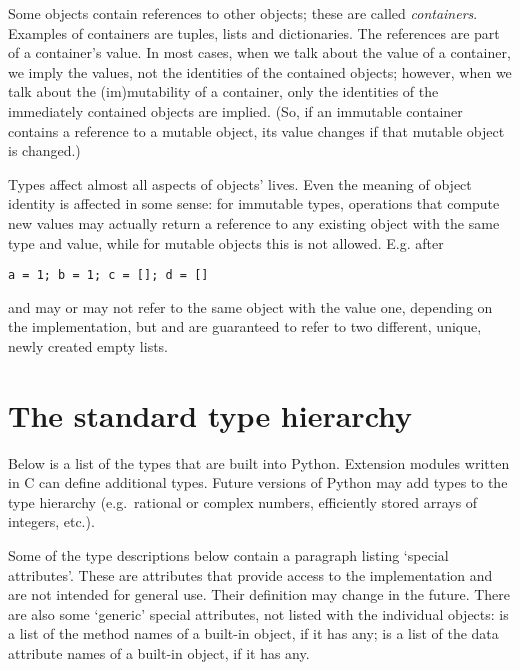 Some objects contain references to other objects; these are called
\emph{containers}.  Examples of containers are tuples, lists and
dictionaries.  The references are part of a container's value.  In
most cases, when we talk about the value of a container, we imply the
values, not the identities of the contained objects; however, when we
talk about the (im)mutability of a container, only the identities of
the immediately contained objects are implied.  (So, if an immutable
container contains a reference to a mutable object, its value changes
if that mutable object is changed.)

Types affect almost all aspects of objects' lives.  Even the meaning
of object identity is affected in some sense: for immutable types,
operations that compute new values may actually return a reference to
any existing object with the same type and value, while for mutable
objects this is not allowed.  E.g. after

\begin{verbatim}
a = 1; b = 1; c = []; d = []
\end{verbatim}

 and  may or may not refer to the same object with the
value one, depending on the implementation, but  and 
are guaranteed to refer to two different, unique, newly created empty
lists.

\section{The standard type hierarchy} \label{types}

Below is a list of the types that are built into Python.  Extension
modules written in C can define additional types.  Future versions of
Python may add types to the type hierarchy (e.g.\ rational or complex
numbers, efficiently stored arrays of integers, etc.).

Some of the type descriptions below contain a paragraph listing
`special attributes'.  These are attributes that provide access to the
implementation and are not intended for general use.  Their definition
may change in the future.  There are also some `generic' special
attributes, not listed with the individual objects: 
is a list of the method names of a built-in object, if it has any;
 is a list of the data attribute names of a built-in
object, if it has any.

